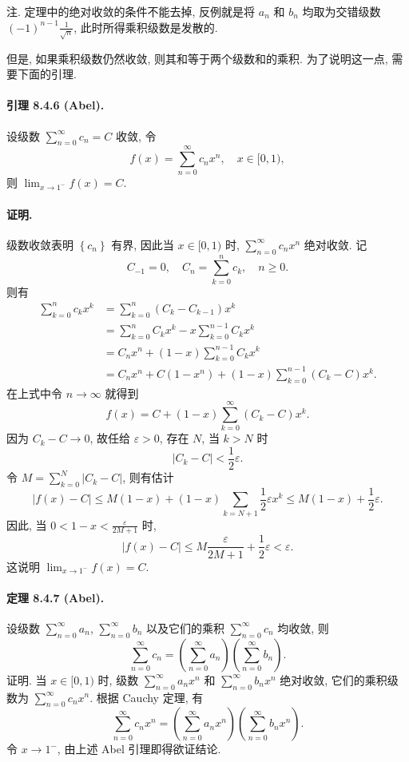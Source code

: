 注. 定理中的绝对收敛的条件不能去掉, 反例就是将 $a_{n}$ 和 $b_{n}$ 均取为交错级数 $(-1)^{n-1}\frac{1}{\sqrt{n}}$,
此时所得乘积级数是发散的. 

但是, 如果乘积级数仍然收敛, 则其和等于两个级数和的乘积. 为了说明这一点, 需要下面的引理.

\paragraph{引理 8.4.6 (Abel). }

设级数 $\sum_{n=0}^{\infty}c_{n}=C$ 收敛, 令 
\[
f(x)=\sum_{n=0}^{\infty}c_{n}x^{n},\quad x\in[0,1),
\]
则 $\lim_{x\rightarrow1^{-}}f(x)=C$.

\paragraph{证明. }

级数收敛表明 $\left\{ c_{n}\right\} $ 有界, 因此当 $x\in[0,1)$ 时, $\sum_{n=0}^{\infty}c_{n}x^{n}$
绝对收敛. 记 
\[
C_{-1}=0,\quad C_{n}=\sum_{k=0}^{n}c_{k},\quad n\geqslant0.
\]
则有 
\[
\begin{aligned}\sum_{k=0}^{n}c_{k}x^{k} & =\sum_{k=0}^{n}\left(C_{k}-C_{k-1}\right)x^{k}\\
 & =\sum_{k=0}^{n}C_{k}x^{k}-x\sum_{k=0}^{n-1}C_{k}x^{k}\\
 & =C_{n}x^{n}+(1-x)\sum_{k=0}^{n-1}C_{k}x^{k}\\
 & =C_{n}x^{n}+C\left(1-x^{n}\right)+(1-x)\sum_{k=0}^{n-1}\left(C_{k}-C\right)x^{k}.
\end{aligned}
\]
在上式中令 $n\rightarrow\infty$ 就得到 
\[
f(x)=C+(1-x)\sum_{k=0}^{\infty}\left(C_{k}-C\right)x^{k}.
\]
因为 $C_{k}-C\rightarrow0$, 故任给 $\varepsilon>0$, 存在 $N$, 当 $k>N$
时 
\[
\left|C_{k}-C\right|<\frac{1}{2}\varepsilon.
\]
令 $M=\sum_{k=0}^{N}\left|C_{k}-C\right|$, 则有估计 
\[
|f(x)-C|\leqslant M(1-x)+(1-x)\sum_{k=N+1}\frac{1}{2}\varepsilon x^{k}\leqslant M(1-x)+\frac{1}{2}\varepsilon.
\]
因此, 当 $0<1-x<\frac{\varepsilon}{2M+1}$ 时, 
\[
|f(x)-C|\leqslant M\frac{\varepsilon}{2M+1}+\frac{1}{2}\varepsilon<\varepsilon.
\]
这说明 $\lim_{x\rightarrow1^{-}}f(x)=C$.

\paragraph{定理 8.4.7 (Abel). }

设级数 $\sum_{n=0}^{\infty}a_{n}$, $\sum_{n=0}^{\infty}b_{n}$ 以及它们的乘积
$\sum_{n=0}^{\infty}c_{n}$ 均收敛, 则 
\[
\sum_{n=0}^{\infty}c_{n}=\left(\sum_{n=0}^{\infty}a_{n}\right)\left(\sum_{n=0}^{\infty}b_{n}\right).
\]
证明. 当 $x\in[0,1)$ 时, 级数 $\sum_{n=0}^{\infty}a_{n}x^{n}$ 和 $\sum_{n=0}^{\infty}b_{n}x^{n}$
绝对收敛, 它们的乘积级数为 $\sum_{n=0}^{\infty}c_{n}x^{n}$. 根据 Cauchy 定理, 有 
\[
\sum_{n=0}^{\infty}c_{n}x^{n}=\left(\sum_{n=0}^{\infty}a_{n}x^{n}\right)\left(\sum_{n=0}^{\infty}b_{n}x^{n}\right).
\]
令 $x\rightarrow1^{-}$, 由上述 Abel 引理即得欲证结论.

